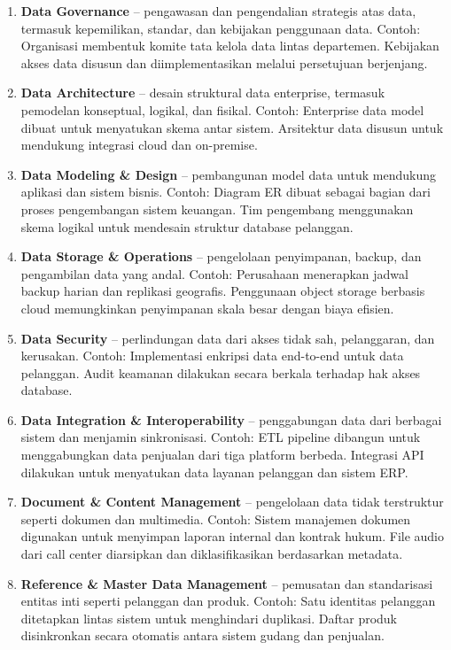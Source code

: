 \begin{enumerate}
	\item \textbf{Data Governance} – pengawasan dan pengendalian strategis atas data, termasuk kepemilikan, standar, dan kebijakan penggunaan data. Contoh: Organisasi membentuk komite tata kelola data lintas departemen. Kebijakan akses data disusun dan diimplementasikan melalui persetujuan berjenjang.
	
	\item \textbf{Data Architecture} – desain struktural data enterprise, termasuk pemodelan konseptual, logikal, dan fisikal. Contoh: Enterprise data model dibuat untuk menyatukan skema antar sistem. Arsitektur data disusun untuk mendukung integrasi cloud dan on-premise.
	
	\item \textbf{Data Modeling \& Design} – pembangunan model data untuk mendukung aplikasi dan sistem bisnis. Contoh: Diagram ER dibuat sebagai bagian dari proses pengembangan sistem keuangan. Tim pengembang menggunakan skema logikal untuk mendesain struktur database pelanggan.
	
	\item \textbf{Data Storage \& Operations} – pengelolaan penyimpanan, backup, dan pengambilan data yang andal. Contoh: Perusahaan menerapkan jadwal backup harian dan replikasi geografis. Penggunaan object storage berbasis cloud memungkinkan penyimpanan skala besar dengan biaya efisien.
	
	\item \textbf{Data Security} – perlindungan data dari akses tidak sah, pelanggaran, dan kerusakan. Contoh: Implementasi enkripsi data end-to-end untuk data pelanggan. Audit keamanan dilakukan secara berkala terhadap hak akses database.
	
	\item \textbf{Data Integration \& Interoperability} – penggabungan data dari berbagai sistem dan menjamin sinkronisasi. Contoh: ETL pipeline dibangun untuk menggabungkan data penjualan dari tiga platform berbeda. Integrasi API dilakukan untuk menyatukan data layanan pelanggan dan sistem ERP.
	
	\item \textbf{Document \& Content Management} – pengelolaan data tidak terstruktur seperti dokumen dan multimedia. Contoh: Sistem manajemen dokumen digunakan untuk menyimpan laporan internal dan kontrak hukum. File audio dari call center diarsipkan dan diklasifikasikan berdasarkan metadata.
	
	\item \textbf{Reference \& Master Data Management} – pemusatan dan standarisasi entitas inti seperti pelanggan dan produk. Contoh: Satu identitas pelanggan ditetapkan lintas sistem untuk menghindari duplikasi. Daftar produk disinkronkan secara otomatis antara sistem gudang dan penjualan.
	

\end{enumerate}
